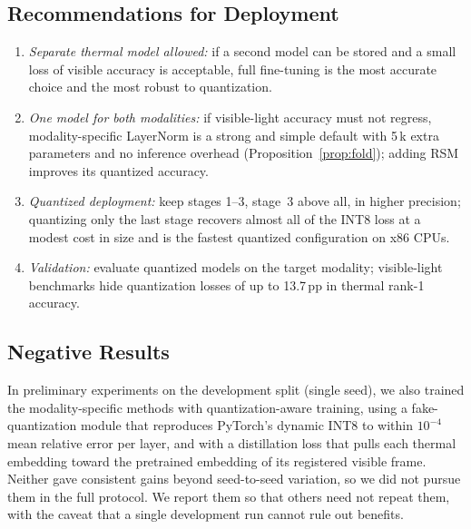 \documentclass[journal]{IEEEtran}
\begin{document}
\subsection{Recommendations for Deployment}
\begin{enumerate}
  \item \emph{Separate thermal model allowed:} if a second model can be stored and a small loss of visible accuracy is acceptable, full fine-tuning is the most accurate choice and the most robust to quantization.
  \item \emph{One model for both modalities:} if visible-light accuracy must not regress, modality-specific LayerNorm is a strong and simple default with 5\,k extra parameters and no inference overhead (Proposition~\ref{prop:fold}); adding RSM improves its quantized accuracy.
  \item \emph{Quantized deployment:} keep stages 1--3, stage~3 above all, in higher precision; quantizing only the last stage recovers almost all of the INT8 loss at a modest cost in size and is the fastest quantized configuration on x86 CPUs.
  \item \emph{Validation:} evaluate quantized models on the target modality; visible-light benchmarks hide quantization losses of up to 13.7\,pp in thermal rank-1 accuracy.
\end{enumerate}

\subsection{Negative Results}
In preliminary experiments on the development split (single seed), we also trained the modality-specific methods with quantization-aware training, using a fake-quantization module that reproduces PyTorch's dynamic INT8 to within $10^{-4}$ mean relative error per layer, and with a distillation loss that pulls each thermal embedding toward the pretrained embedding of its registered visible frame. Neither gave consistent gains beyond seed-to-seed variation, so we did not pursue them in the full protocol. We report them so that others need not repeat them, with the caveat that a single development run cannot rule out benefits.
\end{document}
